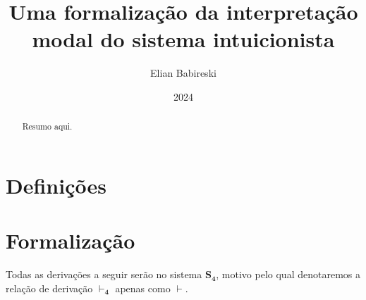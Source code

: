 \documentclass[12pt]{report}
\newcommand{\entails}{\mathrel{\vdash}}
\begin{document}
    \title{Uma formalização da interpretação modal do sistema intuicionista}
    \author{Elian Babireski}
    \date{2024}

    \maketitle

    \begin{abstract}
        Resumo aqui.
    \end{abstract}

    \tableofcontents

    
    
    

    \chapter{Definições}
        
        
        

    \chapter{Formalização}
        Todas as derivações a seguir serão no sistema $\mathbf{S_4}$, motivo pelo qual denotaremos a relação de derivação $\entails_{\mathbf{4}}$ apenas como $\entails$.

        
        
        
        
        

    
    
\end{document}
